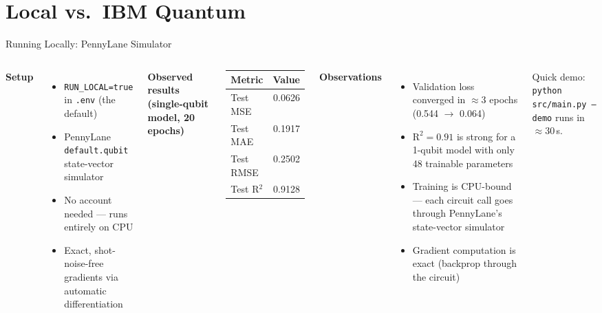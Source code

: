 \documentclass[aspectratio=169,professionalfonts]{beamer}
\begin{document}
\section{Local vs.\ IBM Quantum}

\begin{frame}{Running Locally: PennyLane Simulator}
\begin{columns}[T]
\textbf{Setup}
\begin{itemize}
  \item \texttt{RUN\_LOCAL=true} in \texttt{.env} (the default)
  \item PennyLane \texttt{default.qubit} state-vector simulator
  \item No account needed --- runs entirely on CPU
  \item Exact, shot-noise-free gradients via automatic differentiation
\end{itemize}

\vspace{0.5em}
\textbf{Observed results (single-qubit model, 20 epochs)}
\begin{center}
\begin{tabular}{lr}
\toprule
Metric & Value \\
\midrule
Test MSE   & 0.0626 \\
Test MAE   & 0.1917 \\
Test RMSE  & 0.2502 \\
Test R$^2$ & 0.9128 \\
\bottomrule
\end{tabular}
\end{center}

\textbf{Observations}
\begin{itemize}
  \item Validation loss converged in $\approx 3$ epochs (0.544 $\to$ 0.064)
  \item $\text{R}^2 = 0.91$ is strong for a 1-qubit model with only 48 trainable parameters
  \item Training is CPU-bound --- each circuit call goes through PennyLane's state-vector simulator
  \item Gradient computation is exact (backprop through the circuit)
\end{itemize}

\vspace{0.4em}
\alert{Quick demo:} \texttt{python src/main.py --demo} runs in $\approx$30\,s.
\end{columns}
\end{frame}
\end{document}

